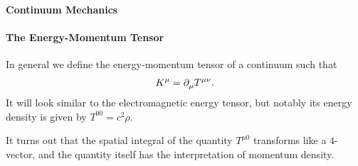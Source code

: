 \paragraph{Continuum Mechanics}

\paragraph{The Energy-Momentum Tensor}
In general we define the energy-momentum tensor of a continuum such that
\begin{align*}
	K^{\mu} = \partial^{}_{\mu}T^{\mu\nu}.
\end{align*}
It will look similar to the electromagnetic energy tensor, but notably its energy density is given by $T^{00} = c^{2}\rho$.

It turns out that the spatial integral of the quantity $T^{\mu 0}$ transforms like a $4$-vector, and the quantity itself has the interpretation of momentum density.